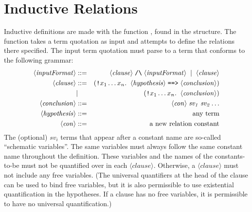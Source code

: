 \section{Inductive Relations}

Inductive definitions are made with the function , found
in the  structure.  The  function takes a
term quotation as input and attempts to define the relations there
specified.  The input term quotation must parse to a term that
conforms to the following grammar:
\newcommand{\nonterm}[1]{\ensuremath{\langle\mathit{#1}\rangle}}
\begin{eqnarray*}
   \nonterm{inputFormat} &::=& \nonterm{clause} \;\holtxt{/\bk}\; \nonterm{inputFormat} \;\;|\;\; \nonterm{clause}\\
   \nonterm{clause}       &::=& (\holtxt{!}x_1 \dots
   x_n. \;\;\nonterm{hypothesis} \;\holtxt{==>}
   \;\nonterm{conclusion})\\
   &|& (\holtxt{!}x_1\dots x_n.\;\;\nonterm{conclusion})\\
   \nonterm{conclusion}   &::=& \nonterm{con} \;\mathit{sv_1}\; \mathit{sv_2} \dots\\
   \nonterm{hypothesis}   &::=& \mbox{any term}\\
   \nonterm{con}          &::=& \mbox{a new relation constant}
\end{eqnarray*}
The (optional) $\mathit{sv}_i$ terms that appear after a constant name are
so-called ``schematic variables''.  The same variables must always
follow the same constant name throughout the definition.  These
variables and the names of the constants-to-be must not be quantified
over in each {\nonterm{clause}}.  Otherwise, a {\nonterm{clause}} must
not include any free variables.  (The universal quantifiers at the
head of the clause can be used to bind free variables, but it is also
permissible to use existential quantification in the hypotheses.  If a
clause has no free variables, it is permissible to have no universal
quantification.)

